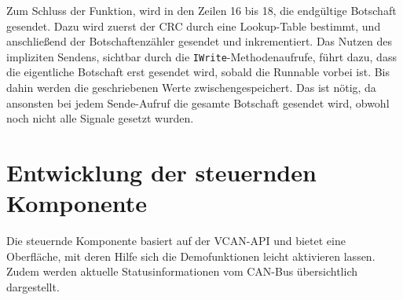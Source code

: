 \documentclass[
  a4paper,					    %
  twoside,
  DIV=calc,     				%
  bibliography=totoc,
  cleardoublepage=empty,
  ngerman,     					%
  final       					%
]{scrbook}
\begin{document}
Zum Schluss der Funktion, wird in den Zeilen 16 bis 18, die endgültige Botschaft gesendet. Dazu wird zuerst der CRC durch eine Lookup-Table bestimmt, und anschließend der Botschaftenzähler gesendet und inkrementiert. Das Nutzen des impliziten Sendens, sichtbar durch die \texttt{IWrite}-Methodenaufrufe, führt dazu, dass die eigentliche Botschaft erst gesendet wird, sobald die Runnable vorbei ist. Bis dahin werden die geschriebenen Werte zwischengespeichert. Das ist nötig, da ansonsten bei jedem Sende-Aufruf die gesamte Botschaft gesendet wird, obwohl noch nicht alle Signale gesetzt wurden.









\section{Entwicklung der steuernden Komponente}
\label{sec:entwicklung_vcan_app}
Die steuernde Komponente basiert auf der VCAN-API und bietet eine Oberfläche, mit deren Hilfe sich die Demofunktionen leicht aktivieren lassen. Zudem werden aktuelle Statusinformationen vom CAN-Bus übersichtlich dargestellt. 
\end{document}
